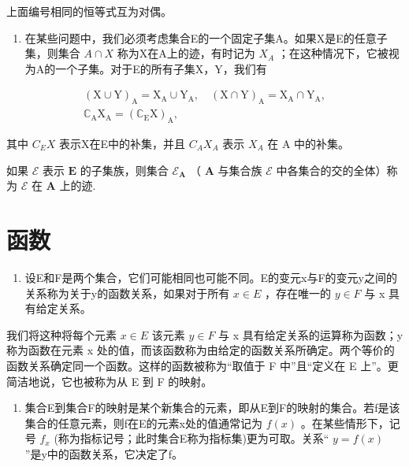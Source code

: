 上面编号相同的恒等式互为对偶。

\begin{enumerate}
\def\labelenumi{\arabic{enumi}.}
\setcounter{enumi}{15}
\tightlist
\item
  在某些问题中，我们必须考虑集合E的一个固定子集A。如果X是E的任意子集，则集合 \(A \cap X\) 称为X在A上的迹，有时记为 \(X_{A}\) ；在这种情况下，它被视为A的一个子集。对于E的所有子集X，Y，我们有
\end{enumerate}

\[
\begin{array}{c} (\mathrm{X} \cup \mathrm{Y}) _ {\mathrm{A}} = \mathrm{X} _ {\mathrm{A}} \cup \mathrm{Y} _ {\mathrm{A}}, \quad (\mathrm{X} \cap \mathrm{Y}) _ {\mathrm{A}} = \mathrm{X} _ {\mathrm{A}} \cap \mathrm{Y} _ {\mathrm{A}}, \\ \mathbb {C} _ {\mathrm{A}} \mathrm{X} _ {\mathrm{A}} = (\mathbb {C} _ {\mathrm{E}} \mathrm{X}) _ {\mathrm{A}}, \end{array}
\]

其中 \(C_{E}X\) 表示X在E中的补集，并且 \(C_{A}X_{A}\) 表示 \(X_{A}\) 在 A 中的补集。

如果 \(\mathcal{E}\) 表示 \(\mathbf{E}\) 的子集族，则集合 \(\mathcal{E}_{\mathbf{A}}\) （ \(\mathbf{A}\) 与集合族 \(\mathcal{E}\) 中各集合的交的全体）称为 \(\mathcal{E}\) 在 \(\mathbf{A}\) 上的迹.

\section{函数}

\begin{enumerate}
\def\labelenumi{\arabic{enumi}.}
\tightlist
\item
  设E和F是两个集合，它们可能相同也可能不同。E的变元x与F的变元y之间的关系称为关于y的函数关系，如果对于所有 \(x \in E\) ，存在唯一的 \(y \in F\) 与 x 具有给定关系。
\end{enumerate}

我们将这种将每个元素 \(x \in E\) 该元素 \(y \in F\) 与 x 具有给定关系的运算称为函数；y 称为函数在元素 x 处的值，而该函数称为由给定的函数关系所确定。两个等价的函数关系确定同一个函数。这样的函数被称为“取值于 F 中”且“定义在 E 上”。更简洁地说，它也被称为从 E 到 F 的映射。

\begin{enumerate}
\def\labelenumi{\arabic{enumi}.}
\setcounter{enumi}{1}
\tightlist
\item
  集合E到集合F的映射是某个新集合的元素，即从E到F的映射的集合。若f是该集合的任意元素，则f在E的元素x处的值通常记为 \(f(x)\) 。在某些情形下，记号 \(f_{x}\) (称为指标记号；此时集合E称为指标集)更为可取。关系“ \(y = f(x)\) ''是y中的函数关系，它决定了f。
\end{enumerate}

